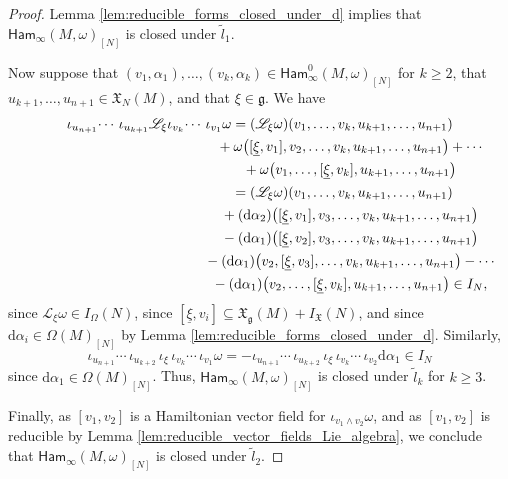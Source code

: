 \documentclass[pdftex]{sigma}
\numberwithin{equation}{section}
\newcommand{\g}{\mathfrak{g}}
\newcommand{\Ham}{\mathsf{Ham}}
\newcommand{\fgmodule}{\mathfrak{X}_{\g}}
\newcommand{\vanvf}{I_{\mathfrak{X}}(N)}%
\renewcommand{\L}{\mathscr{L}}
\newcommand{\X}{\mathfrak{X}}
\renewcommand{\subset}{\subseteq}
\renewcommand{\d}{\mathrm{d}}
\begin{document}
\begin{proof}
	Lemma \ref{lem:reducible_forms_closed_under_d} implies that $\Ham_\infty(M,\omega)_{[N]}$ is closed under $\tilde{l}_1$.

Now suppose that $(v_1,\alpha_1),\dots,(v_k,\alpha_k)\in \Ham_\infty^0(M,\omega)_{[N]}$ for $k\geq 2$, that $u_{k+1},\dots,u_{n+1}\in\X_N(M)$, and that $\xi\in\g$. We have
\begin{gather*}
\iota_{u_{n+1}}\!\cdots\,\iota_{u_{k+1}}\L_\xi\iota_{v_k}\!\cdots\,\iota_{v_1}\omega
=	(\L_\xi\omega)(v_1,\dots,v_k,u_{k+1},\dots,u_{n+1})			             \\ \hphantom{\iota_{u_{n+1}}\!\cdots\,\iota_{u_{k+1}}\L_\xi\iota_{v_k}\!\cdots\,\iota_{v_1}\omega=}{}
+\omega\bigl([\underline\xi,v_1],v_2,\dots,v_k,u_{k+1},\dots,u_{n+1}\bigr)  +\cdots   \\  \hphantom{\iota_{u_{n+1}}\!\cdots\,\iota_{u_{k+1}}\L_\xi\iota_{v_k}\!\cdots\,\iota_{v_1}\omega=}{}
+\omega\bigl(v_1,\dots,[\underline\xi,v_k],u_{k+1},\dots,u_{n+1}\bigr)         \\ \hphantom{\iota_{u_{n+1}}\!\cdots\,\iota_{u_{k+1}}\L_\xi\iota_{v_k}\!\cdots\,\iota_{v_1}\omega}{}
=	(\L_\xi\omega)(v_1,\dots,v_k,u_{k+1},\dots,u_{n+1})		               	 \\ \hphantom{\iota_{u_{n+1}}\!\cdots\,\iota_{u_{k+1}}\L_\xi\iota_{v_k}\!\cdots\,\iota_{v_1}\omega=}{}
+(\d\alpha_2)\bigl([\underline\xi,v_1],v_3,\dots,v_k,u_{k+1},\dots,u_{n+1}\bigr)       \\ \hphantom{\iota_{u_{n+1}}\!\cdots\,\iota_{u_{k+1}}\L_\xi\iota_{v_k}\!\cdots\,\iota_{v_1}\omega=}{}
-(\d\alpha_1)\bigl([\underline\xi,v_2],v_3,\dots,v_k,u_{k+1},\dots,u_{n+1}\bigr)	     \\ \hphantom{\iota_{u_{n+1}}\!\cdots\,\iota_{u_{k+1}}\L_\xi\iota_{v_k}\!\cdots\,\iota_{v_1}\omega=}{}
-(\d\alpha_1)\bigl(v_2,[\underline\xi,v_3],\dots,v_k,u_{k+1},\dots,u_{n+1}\bigr)    -\cdots 	 \\ \hphantom{\iota_{u_{n+1}}\!\cdots\,\iota_{u_{k+1}}\L_\xi\iota_{v_k}\!\cdots\,\iota_{v_1}\omega=}{}
-(\d\alpha_1)\bigl(v_2,\dots,[\underline\xi,v_k],u_{k+1},\dots,u_{n+1}\bigr)
\in I_N,
	\end{gather*}
	since $\L_\xi\omega\in I_\Omega(N)$, since $[\underline\xi,v_i]\subset\fgmodule(M) + \vanvf$, and since $\d\alpha_i\in\Omega(M)_{[N]}$ by Lemma \ref{lem:reducible_forms_closed_under_d}. Similarly,
	\[
		\iota_{u_{n+1}}\!\cdots\,\iota_{u_{k+2}}\,\iota_\xi\,\iota_{v_k}\!\cdots\,\iota_{v_1}\omega
			= - \iota_{u_{n+1}}\!\cdots\,\iota_{u_{k+2}}\,\iota_\xi\,\iota_{v_k}\!\cdots\,\iota_{v_2}\d\alpha_1
			\in I_N
	\]
	since $\d\alpha_1\in\Omega(M)_{[N]}$. Thus, $\Ham_\infty(M,\omega)_{[N]}$ is closed under $\tilde{l}_k$ for $k\geq 3$.

	Finally, as $[v_1,v_2]$ is a Hamiltonian vector field for $\iota_{v_1\wedge v_2}\omega$, and as $[v_1,v_2]$ is reducible by Lemma \ref{lem:reducible_vector_fields_Lie_algebra}, we conclude that $\Ham_\infty(M,\omega)_{[N]}$ is closed under $\tilde{l}_2$.
\end{proof}
\end{document}
